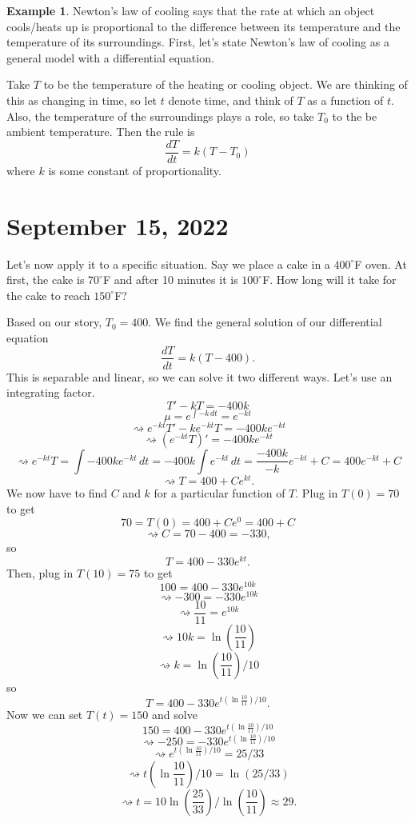\documentclass[12pt]{amsart}
\numberwithin{equation}{section}
\theoremstyle{plain} %
\newcommand{\Sept}[1]{\section{September #1, 2022}}
\newcommand{\rsa}{\rightsquigarrow}
\theoremstyle{definition}
\newtheorem{ex}[equation]{Example}
\theoremstyle{remark}
\begin{document}
\begin{ex} Newton's law of cooling says that the rate at which an object cools/heats up is proportional to the difference between its temperature and the temperature of its surroundings.  First, let's state Newton's law of cooling as a general model with a differential equation.

Take $T$ to be the temperature of the heating or cooling object. We are thinking of this as changing in time, so let $t$ denote time, and think of $T$ as a function of $t$. Also, the temperature of the surroundings plays a role, so take $T_0$ to the be ambient temperature. Then the rule is
\[ \frac{dT}{dt} = k (T-T_0)\]
where $k$ is some constant of proportionality.

\Sept{15}

Let's now apply it to a specific situation. Say we place a cake in a $400^{\circ}$F oven. At first, the cake is 
 $70^{\circ}$F and after 10 minutes it is  $100^{\circ}$F. How long will it take for the cake to reach  $150^{\circ}$F?
 
Based on our story, $T_0=400$. We find the general solution of our differential equation
\[ \frac{dT}{dt} = k (T-400).\]
This is separable and linear, so we can solve it two different ways. Let's use an integrating factor.
\[T' - kT = -400 k\]
\[ \mu = e^{\int -k \, dt} = e^{-kt}\]
\[ \rsa e^{-kt} T' - k e^{-kt} T = -400k e^{-kt}\]
\[ \rsa (e^{-kt} T) ' = -400k e^{-kt}\]
\[ \rsa e^{-kt} T = \int -400k e^{-kt} \, dt = -400k \int e^{-kt} \, dt = \frac{-400k}{-k} e^{-kt} +C =400 e^{-kt} +C\]
\[ \rsa T = 400 + C e^{kt}.\]
We now have to find $C$ and $k$ for a particular function of $T$. Plug in $T(0)=70$ to get
\[ 70 = T(0) = 400 + C e^{0} = 400 + C\]
\[\rsa C= 70-400 = -330,\]
so
\[ T= 400 -330 e^{kt}.\]
Then, plug in $T(10)=75$ to get
\[ 100 = 400 - 330 e^{10 k}\]
\[\rsa -300 = -330 e^{10 k}\]
\[ \rsa \frac{10}{11} = e^{10k}\]
\[ \rsa 10k = \ln(\frac{10}{11})\]
\[ \rsa k = \ln(\frac{10}{11})/10\]
so
\[ T = 400 - 330 e^{t (\ln\frac{10}{11}) /10}.\]
Now we can set $T(t) = 150$ and solve
\[ 150 = 400 - 330 e^{t (\ln\frac{10}{11}) /10}\]
\[ \rsa -250 = -330 e^{t (\ln \frac{10}{11}) /10}\]
\[ \rsa e^{t (\ln \frac{10}{11}) /10} = 25/33\]
\[ \rsa t (\ln \frac{10}{11}) /10 = \ln(25/33)\]
\[ \rsa t = 10 \ln(\frac{25}{33}) / \ln(\frac{10}{11}) \approx 29.\]
\end{ex}
\end{document}
